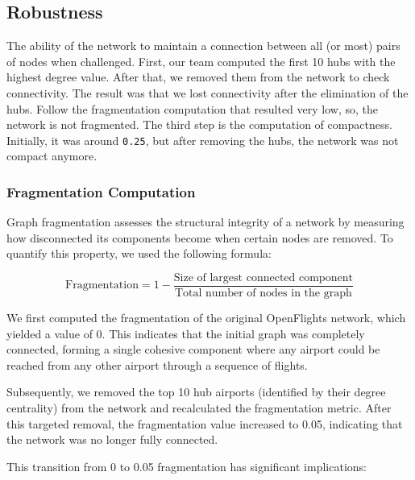 \documentclass[12pt]{article}
\begin{document}
    \subsection{Robustness}\label{subsec:robustness}
    The ability of the network to maintain a connection between all (or most) pairs of nodes when challenged. First, our team computed the first 10 hubs with the highest degree value. After that, we removed them from the network to check connectivity. The result was that we lost connectivity after the elimination of the hubs. Follow the fragmentation computation that resulted very low, so, the network is not fragmented. The third step is the computation of compactness. Initially, it was around \texttt{0.25}, but after removing the hubs, the network was not compact anymore.

    \subsubsection{Fragmentation Computation}
    Graph fragmentation assesses the structural integrity of a network by measuring how disconnected its components become when certain nodes are removed. To quantify this property, we used the following formula:
    
    \begin{equation}
        \text{Fragmentation} = 1 - \frac{\text{Size of largest connected component}}{\text{Total number of nodes in the graph}}
    \end{equation}
    
    We first computed the fragmentation of the original OpenFlights network, which yielded a value of 0. This indicates that the initial graph was completely connected, forming a single cohesive component where any airport could be reached from any other airport through a sequence of flights.
    
    Subsequently, we removed the top 10 hub airports (identified by their degree centrality) from the network and recalculated the fragmentation metric. After this targeted removal, the fragmentation value increased to 0.05, indicating that the network was no longer fully connected.
    
    This transition from 0 to 0.05 fragmentation has significant implications:
    
\end{document}
